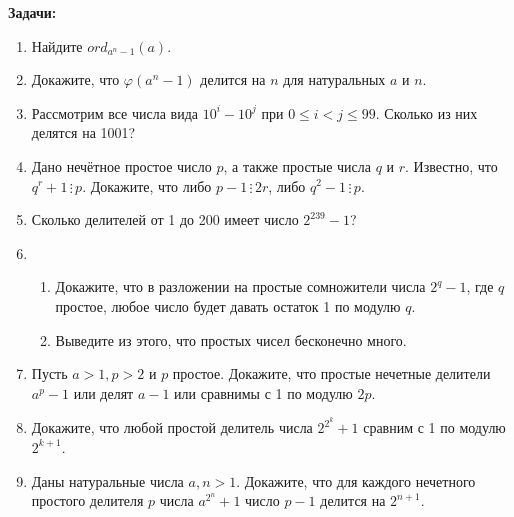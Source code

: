 \documentclass{article}
\begin{document}
\textbf{Задачи:}  

\begin{enumerate}[label*=\protect\fbox{\arabic{enumi}}]
	
	\item Найдите $ord_{a^n-1}(a).$
	
	\item Докажите, что $ \varphi(a^n - 1) $ делится на $ n $ для натуральных $ a $ и $ n $.
	
	\item Рассмотрим все числа вида $10^i - 10^j$ при $0 \leqslant i < j \leqslant 99$. Сколько из них делятся
	на 1001?
	
	\item Дано нечётное простое число $p$, а также простые числа $q$ и $r$. Известно, что
	$q^r +1 \,\vdots\, p$. Докажите, что либо $p - 1 \,\vdots\, 2r$, либо $q^2- 1 \,\vdots\, p$.
	
	\item Сколько делителей от 1 до 200 имеет число $2^{239} - 1$?
	
	\item 
	\begin{enumerate}
		
		\item Докажите, что в разложении на простые сомножители числа $2^q -1$, где $ q $ простое, любое число будет давать остаток 1 по модулю $ q $.
		
		\item Выведите из этого, что простых чисел бесконечно много.
		
	\end{enumerate}

	\item Пусть $a > 1, p > 2$ и $ p $ простое. Докажите, что простые нечетные делители $ a^p - 1 $ или делят $ a - 1 $ или сравнимы с 1 по модулю $ 2p $.
	
	\item Докажите, что любой простой делитель числа $ 2^{2^k} + 1 $ сравним с 1 по модулю $ 2^{k + 1} $.

	\item Даны натуральные числа $a, n > 1$. Докажите, что для каждого нечетного простого делителя $ p $ числа $ a^{2^n} + 1 $ число $ p - 1 $ делится на $ 2^{n+1} $.
	

\end{enumerate}
\end{document}
